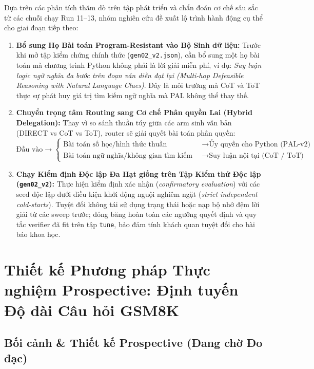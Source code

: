 \documentclass[11pt,a4paper]{report}
\begin{document}
Dựa trên các phân tích thăm dò trên tập phát triển và chẩn đoán cơ chế sâu sắc từ các chuỗi chạy Run 11--13, nhóm nghiên cứu đề xuất lộ trình hành động cụ thể cho giai đoạn tiếp theo:

\begin{enumerate}[leftmargin=*]
    \item \textbf{Bổ sung Họ Bài toán Program-Resistant vào Bộ Sinh dữ liệu:}  
    Trước khi mở tập kiểm chứng chính thức (\texttt{gen02\_v2.json}), cần bổ sung một họ bài toán mà chương trình Python không phải là lời giải miễn phí, ví dụ: \textit{Suy luận logic ngữ nghĩa đa bước trên đoạn văn diễn đạt lại (Multi-hop Defeasible Reasoning with Natural Language Clues)}. Đây là môi trường mà CoT và ToT thực sự phát huy giá trị tìm kiếm ngữ nghĩa mà PAL không thể thay thế.

    \item \textbf{Chuyển trọng tâm Routing sang Cơ chế Phân quyền Lai (Hybrid Delegation):}  
    Thay vì so sánh thuần túy giữa các arm sinh văn bản (DIRECT vs CoT vs ToT), router sẽ giải quyết bài toán phân quyền:
    $$\text{Đầu vào} \longrightarrow \begin{cases}
    \text{Bài toán số học/hình thức thuần} & \longrightarrow \text{Ủy quyền cho Python (PAL-v2)} \\
    \text{Bài toán ngữ nghĩa/không gian tìm kiếm mở} & \longrightarrow \text{Suy luận nội tại (CoT / ToT)}
    \end{cases}$$

    \item \textbf{Chạy Kiểm định Độc lập Đa Hạt giống trên Tập Kiểm thử Độc lập (\texttt{gen02\_v2}):}  
    Thực hiện kiểm định xác nhận (\textit{confirmatory evaluation}) với các seed độc lập dưới điều kiện khởi động nguội nghiêm ngặt (\textit{strict independent cold-starts}). Tuyệt đối không tái sử dụng trạng thái hoặc nạp bộ nhớ đệm lời giải từ các sweep trước; đóng băng hoàn toàn các ngưỡng quyết định và quy tắc verifier đã fit trên tập \texttt{tune}, bảo đảm tính khách quan tuyệt đối cho bài báo khoa học.
\end{enumerate}

\newpage

\chapter{Thiết kế Phương pháp Thực nghiệm Prospective: Định tuyến Độ dài Câu hỏi GSM8K}

\section{Bối cảnh \& Thiết kế Prospective (Đang chờ Đo đạc)}
\end{document}
